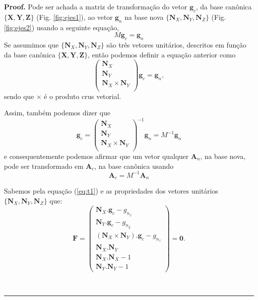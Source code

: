 \documentclass[a4paper,10pt]{report}
\newenvironment{proof}[1][Proof]{\textbf{#1.} }{\ \rule{0.5em}{0.5em}}
\begin{document}
\begin{proof}
Pode ser achada a matriz de transformação do vetor $\mathbf{g}_c$, 
da base canônica $\{\mathbf{X},\mathbf{Y},\mathbf{Z}\}$ (Fig. \ref{fig:ejes1}),
ao vetor $\mathbf{g}_n$ na base nova $\{\mathbf{N}_X,\mathbf{N}_Y,\mathbf{N}_Z\}$ 
(Fig. \ref{fig:ejes2})
usando a seguinte equação,
\begin{equation}\label{eq:t1}
 M \mathbf{g}_c = \mathbf{g}_n
\end{equation}
Se assumimos que $\{\mathbf{N}_X,\mathbf{N}_Y,\mathbf{N}_Z\}$ são três vetores unitários,
descritos em função da base canônica $\{\mathbf{X},\mathbf{Y},\mathbf{Z}\}$,
então podemos definir a equação anterior como
\begin{equation}\label{eq:t2}
\left ( \begin{matrix}
\mathbf{N}_X \\
\mathbf{N}_Y \\
\mathbf{N}_X \times \mathbf{N}_Y \\
\end{matrix}\right) \mathbf{g}_c = \mathbf{g}_n,
\end{equation}
sendo que $\times$ é o produto crus vetorial.

Assim, também podemos dizer que
\begin{equation}\label{eq:t3}
\mathbf{g}_c = \left ( \begin{matrix}
\mathbf{N}_X \\
\mathbf{N}_Y \\
\mathbf{N}_X \times \mathbf{N}_Y \\
\end{matrix}\right)^{-1}  \mathbf{g}_n = M^{-1}  \mathbf{g}_n
\end{equation}
e consequentemente podemos afirmar que um vetor qualquer $\mathbf{A}_n$,
na base nova, pode ser transformado em $\mathbf{A}_c$, na base canônica
usando
\begin{equation}\label{eq:t4}
\mathbf{A}_c = M^{-1}  \mathbf{A}_n
\end{equation}




Sabemos pela equação (\ref{eq:t1}) e as propriedades dos vetores unitários 
$\{\mathbf{N}_X,\mathbf{N}_Y,\mathbf{N}_Z\}$ que:
\begin{equation}\label{eq:M1}
\mathbf{F}=\left ( \begin{matrix}
\mathbf{N}_X . \mathbf{g}_c - {g}_{n_x}\\
\mathbf{N}_Y . \mathbf{g}_c - {g}_{n_y}\\
(\mathbf{N}_X \times \mathbf{N}_Y) . \mathbf{g}_c - {g}_{n_z}\\
\mathbf{N}_X . \mathbf{N}_Y \\
\mathbf{N}_X . \mathbf{N}_X -1\\
\mathbf{N}_Y . \mathbf{N}_Y -1
\end{matrix}\right)=\mathbf{0} .
\end{equation}


\end{proof}
\end{document}
